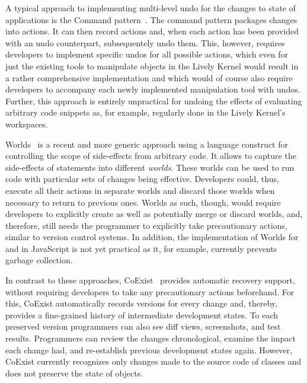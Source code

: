 A typical approach to implementing multi-level undo for the changes to state of applications is the Command pattern~\cite{GammaHelmJohnsonVlissides95}.
The command pattern packages changes into actions.
It can then record actions and, when each action has been provided with an undo counterpart, subsequentely undo them.
This, however, requires developers to implement specific undos for all possible actions, which even for just the existing tools to manipulate objects in the Lively Kernel would result in a rather comprehensive implementation and which would of course also require developers to accompany each newly implemented manipulation tool with undos.  
Further, this approach is entirely unpractical for undoing the effects of evaluating arbitrary code snippets as, for example, regularly done in the Lively Kernel's workspaces.

Worlds~\cite{Warth2011Wor} is a recent and more generic approach using a language construct for controlling the scope of side-effects from arbitrary code.
It allows to capture the side-effects of statements into different \emph{worlds}.
These worlds can be used to run code with particular sets of changes being effective.
Developers could, thus, execute all their actions in separate worlds and discard those worlds when necessary to return to previous ones.
Worlds as such, though, would require developers to explicitly create as well as potentially merge or discard worlds, and, therefore, still needs the programmer to explicitly take precautionary actions, similar to version control systems.
In addition, the implementation of Worlds for and in JavaScript is not yet practical as it, for example, currently prevents garbage collection.

In contrast to these approaches, CoExist~\cite{Steinert2012COE} provides automatic recovery support, without requiring developers to take any precautionary actions beforehand.
For this, CoExist automatically records versions for every change and, thereby, provides a fine-grained history of intermediate development states.
To each preserved version programmers can also see diff views, screenshots, and test results.
Programmers can review the changes chronological, examine the impact each change had, and re-establish previous development states again.
However, CoExist currently recognizes only changes made to the source code of classes and does not preserve the state of objects.

